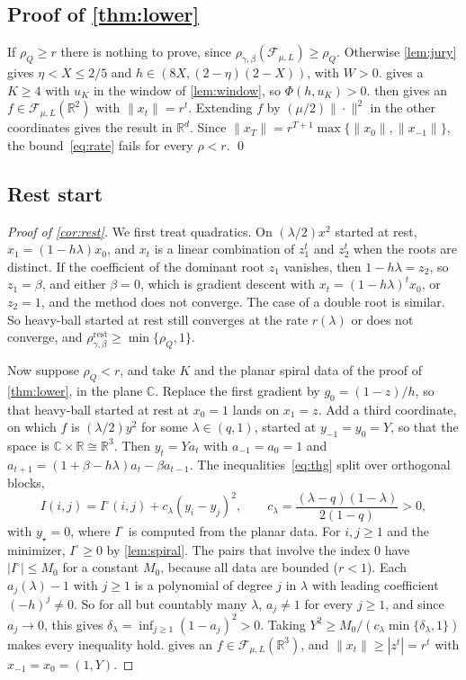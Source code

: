 \documentclass[11pt, a4paper]{article}
\theoremstyle{definition}
\newcommand{\R}{\mathbb{R}}
\newcommand{\C}{\mathbb{C}}
\newcommand{\F}{\mathcal{F}_{\mu,L}}
\newcommand{\rest}{\mathrm{rest}}
\begin{document}
\subsection{Proof of \texorpdfstring{\cref{thm:lower}}{Theorem A}}

If $\rho_Q\ge r$ there is nothing to prove, since $\rho_{\gamma,\beta}(\F)\ge\rho_Q$. Otherwise \cref{lem:jury} gives
$\eta<X\le2/5$ and $h\in(8X,(2-\eta)(2-X))$, with $W>0$.  gives a $K\ge4$ with $u_K$ in the window of
\cref{lem:window}, so $\Phi(h,u_K)>0$.  then gives an $f\in\F(\R^2)$ with $\|x_t\|=r^t$. Extending $f$
by $(\mu/2)\|\cdot\|^2$ in the other coordinates gives the result in $\R^d$. Since
$\|x_T\|=r^{T+1}\max\{\|x_0\|,\|x_{-1}\|\}$, the bound~\eqref{eq:rate} fails for every $\rho<r$. \qed

\subsection{Rest start}
\label{sec:rest}

\begin{proof}[Proof of \cref{cor:rest}]
  We first treat quadratics. On $(\lambda/2)x^2$ started at rest, $x_1=(1-h\lambda)x_0$, and $x_t$ is a linear combination of
  $z_1^t$ and $z_2^t$ when the roots are distinct. If the coefficient of the dominant root $z_1$ vanishes, then $1-h\lambda=z_2$, so
  $z_1=\beta$, and either $\beta=0$, which is gradient descent with $x_t=(1-h\lambda)^tx_0$, or $z_2=1$, and the method
  does not converge. The case of a double root is similar. So heavy-ball started at rest still converges at the rate
  $r(\lambda)$ or does not converge, and $\rho^\rest_{\gamma,\beta}\ge\min\{\rho_Q,1\}$.

  Now suppose $\rho_Q<r$, and take $K$ and the planar spiral data of the proof of \cref{thm:lower}, in the plane $\C$.
  Replace the first gradient by $g_0=(1-z)/h$, so that heavy-ball started at rest at $x_0=1$ lands on $x_1=z$. Add a
  third coordinate, on which $f$ is $(\lambda/2)y^2$ for some $\lambda\in(q,1)$, started at $y_{-1}=y_0=Y$, so that the
  space is $\C\times\R\cong\R^3$. Then $y_t=Ya_t$
  with $a_{-1}=a_0=1$ and $a_{t+1}=(1+\beta-h\lambda)a_t-\beta a_{t-1}$. The inequalities~\eqref{eq:thg} split over
  orthogonal blocks,
  \[
    I(i,j)=I^\circ(i,j)+c_\lambda(y_i-y_j)^2,\qquad c_\lambda=\frac{(\lambda-q)(1-\lambda)}{2(1-q)}>0,
  \]
  with $y_\star=0$, where $I^\circ$ is computed from the planar data. For $i,j\ge1$ and the minimizer, $I^\circ\ge0$ by
  \cref{lem:spiral}. The pairs that involve the index $0$ have $|I^\circ|\le M_0$ for a constant $M_0$, because all data
  are bounded ($r<1$). Each $a_j(\lambda)-1$ with $j\ge1$ is a polynomial of degree $j$ in $\lambda$ with leading coefficient
  $(-h)^j\ne0$. So for all but countably many $\lambda$, $a_j\ne1$ for every $j\ge1$, and since $a_j\to0$, this gives
  $\delta_\lambda=\inf_{j\ge1}(1-a_j)^2>0$. Taking $Y^2\ge M_0/(c_\lambda\min\{\delta_\lambda,1\})$ makes every inequality hold.
   gives an $f\in\F(\R^3)$, and $\|x_t\|\ge|z^t|=r^t$ with $x_{-1}=x_0=(1,Y)$.
\end{proof}
\end{document}
